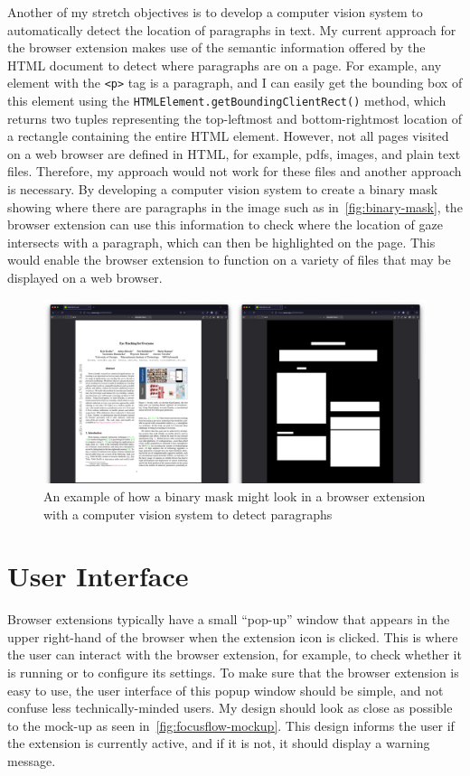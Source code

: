 \documentclass{report}
\begin{document}
Another of my stretch objectives is to develop a computer vision system to automatically detect the location of paragraphs in text. My current approach for the browser extension makes use of the semantic information offered by the HTML document to detect where paragraphs are on a page. For example, any element with the \texttt{<p>} tag is a paragraph, and I can easily get the bounding box of this element using the \texttt{HTMLElement.getBoundingClientRect()} method, which returns two tuples representing the top-leftmost and bottom-rightmost location of a rectangle containing the entire HTML element. However, not all pages visited on a web browser are defined in HTML, for example, pdfs, images, and plain text files. Therefore, my approach would not work for these files and another approach is necessary. By developing a computer vision system to create a binary mask showing where there are paragraphs in the image such as in~\autoref{fig:binary-mask}, the browser extension can use this information to check where the location of gaze intersects with a paragraph, which can then be highlighted on the page. This would enable the browser extension to function on a variety of files that may be displayed on a web browser. 

\begin{figure}
    \centering
    \includegraphics[scale=0.1]{../assets/binary-mask.png}
    \caption{An example of how a binary mask might look in a browser extension with a computer vision system to detect paragraphs}
    \label{fig:binary-mask}
\end{figure}

\section{User Interface} 

Browser extensions typically have a small ``pop-up'' window that appears in the upper right-hand of the browser when the extension icon is clicked. This is where the user can interact with the browser extension, for example, to check whether it is running or to configure its settings. To make sure that the browser extension is easy to use, the user interface of this popup window should be simple, and not confuse less technically-minded users. My design should look as close as possible to the mock-up as seen in~\autoref{fig:focusflow-mockup}. This design informs the user if the extension is currently active, and if it is not, it should display a warning message. 
\end{document}
